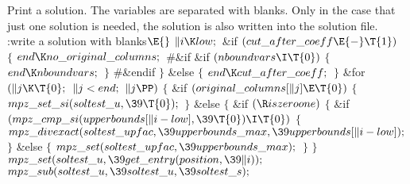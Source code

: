Print a solution. The variables are separated with blanks.
Only in the case that just one solution is needed, the solution is also written
into the solution file.
\Y\B\4:write a solution with blanks\X${}\E{}$\6
$\|i\K\\{low};{}$\6
\&{if} ${}(\\{cut\_after\_coeff}\E{-}\T{1}){}$\5
${}\{{}$\1\6
${}\\{end}\K\\{no\_original\_columns};{}$\6
\8\#\&{if} \6
\&{if} ${}(\\{nboundvars}\I\T{0}){}$\5
${}\{{}$\1\6
${}\\{end}\K\\{nboundvars};{}$\6
\4${}\}{}$\2\6
\8\#\&{endif}\6
\4${}\}{}$\2\6
\&{else}\5
${}\{{}$\1\6
${}\\{end}\K\\{cut\_after\_coeff};{}$\6
\4${}\}{}$\2\6
\&{for} ${}(\|j\K\T{0};{}$ ${}\|j<\\{end};{}$ ${}\|j\PP){}$\5
${}\{{}$\1\6
\&{if} ${}(\\{original\_columns}[\|j]\E\T{0}){}$\5
${}\{{}$\1\6
${}\\{mpz\_set\_si}(\\{soltest\_u},\39\T{0});{}$\6
\4${}\}{}$\2\6
\&{else}\5
${}\{{}$\1\6
\&{if} ${}(\R\\{iszeroone}){}$\5
${}\{{}$\1\6
\&{if} ${}(\\{mpz\_cmp\_si}(\\{upperbounds}[\|i-\\{low}],\39\T{0})\I\T{0}){}$\5
${}\{{}$\1\6
${}\\{mpz\_divexact}(\\{soltest\_upfac},\39\\{upperbounds\_max},\39%
\\{upperbounds}[\|i-\\{low}]);{}$\6
\4${}\}{}$\2\6
\&{else}\5
${}\{{}$\1\6
${}\\{mpz\_set}(\\{soltest\_upfac},\39\\{upperbounds\_max});{}$\6
\4${}\}{}$\2\6
\4${}\}{}$\2\6
${}\\{mpz\_set}(\\{soltest\_u},\39\\{get\_entry}(\\{position},\39\|i));{}$\6
${}\\{mpz\_sub}(\\{soltest\_u},\39\\{soltest\_u},\39\\{soltest\_s});{}$\6
